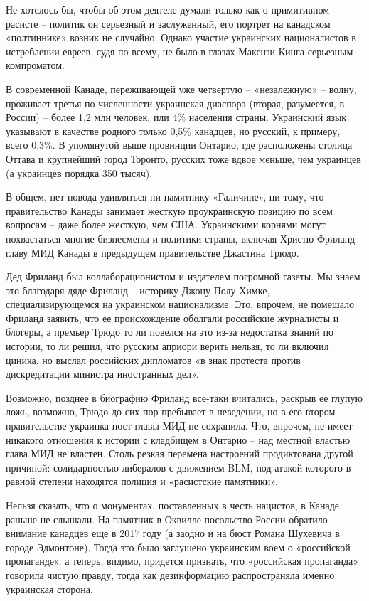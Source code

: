 Не хотелось бы, чтобы об этом деятеле думали только как о примитивном расисте –
политик он серьезный и заслуженный, его портрет на канадском «полтиннике»
возник не случайно. Однако участие украинских националистов в истреблении
евреев, судя по всему, не было в глазах Макензи Кинга серьезным компроматом.

В современной Канаде, переживающей уже четвертую – «незалежную» – волну,
проживает третья по численности украинская диаспора (вторая, разумеется, в
России) – более 1,2 млн человек, или 4\% населения страны. Украинский язык
указывают в качестве родного только 0,5\% канадцев, но русский, к примеру, всего
0,3\%. В упомянутой выше провинции Онтарио, где расположены столица Оттава и
крупнейший город Торонто, русских тоже вдвое меньше, чем украинцев (а украинцев
порядка 350 тысяч).

В общем, нет повода удивляться ни памятнику «Галичине», ни тому, что
правительство Канады занимает жесткую проукраинскую позицию по всем вопросам –
даже более жесткую, чем США. Украинскими корнями могут похвастаться многие
бизнесмены и политики страны, включая Христю Фриланд – главу МИД Канады в
предыдущем правительстве Джастина Трюдо.

Дед Фриланд был коллаборационистом и издателем погромной газеты. Мы знаем это
благодаря дяде Фриланд – историку Джону-Полу Химке, специализирующемся на
украинском национализме. Это, впрочем, не помешало Фриланд заявить, что ее
происхождение оболгали российские журналисты и блогеры, а премьер Трюдо то ли
повелся на это из-за недостатка знаний по истории, то ли решил, что русским
априори верить нельзя, то ли включил циника, но выслал российских дипломатов «в
знак протеста против дискредитации министра иностранных дел».

Возможно, позднее в биографию Фриланд все-таки вчитались, раскрыв ее глупую
ложь, возможно, Трюдо до сих пор пребывает в неведении, но в его втором
правительстве украинка пост главы МИД не сохранила. Что, впрочем, не имеет
никакого отношения к истории с кладбищем в Онтарио – над местной властью глава
МИД не властен. Столь резкая перемена настроений продиктована другой причиной:
солидарностью либералов с движением BLM, под атакой которого в равной степени
находятся полиция и «расистские памятники».

Нельзя сказать, что о монументах, поставленных в честь нацистов, в Канаде
раньше не слышали. На памятник в Оквилле посольство России обратило внимание
канадцев еще в 2017 году (а заодно и на бюст Романа Шухевича в городе
Эдмонтоне). Тогда это было заглушено украинским воем о «российской пропаганде»,
а теперь, видимо, придется признать, что «российская пропаганда» говорила
чистую правду, тогда как дезинформацию распространяла именно украинская
сторона.

